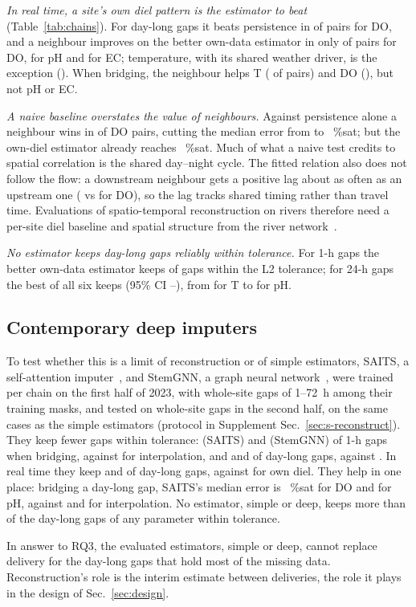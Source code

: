 \emph{In real time, a site's own diel pattern is the estimator to beat} (Table~\ref{tab:chains}). For day-long gaps it beats persistence in \chainDielBeatsPersistDo{} of pairs for DO, and a neighbour improves on the better own-data estimator in only \chainRtWinDo{} of pairs for DO, \chainRtWinPh{} for pH and \chainRtWinEc{} for EC; temperature, with its shared weather driver, is the exception (\chainRtWinT). When bridging, the neighbour helps T (\chainBfWinT{} of pairs) and DO (\chainBfWinDo), but not pH or EC.

\emph{A naive baseline overstates the value of neighbours.} Against persistence alone a neighbour wins in \chainNaiveWinDo{} of DO pairs, cutting the median error from \chainPersistDo{} to \chainBestNbDo~\%sat; but the own-diel estimator already reaches \chainDielDo~\%sat. Much of what a naive test credits to spatial correlation is the shared day--night cycle. The fitted relation also does not follow the flow: a downstream neighbour gets a positive lag about as often as an upstream one (\lagPosDown{} vs \lagPosUp{} for DO), so the lag tracks shared timing rather than travel time. Evaluations of spatio-temporal reconstruction on rivers therefore need a per-site diel baseline and spatial structure from the river network~\cite{peterson2010mixed,jing2024casper}.

\emph{No estimator keeps day-long gaps reliably within tolerance.} For 1-h gaps the better own-data estimator keeps \chainTolOneH{} of gaps within the L2 tolerance; for 24-h gaps the best of all six keeps \recDayAll{} (95\% CI \recDayAllLo--\recDayAllHi), from \recDayT{} for T to \recDayPh{} for pH.

\subsection{Contemporary deep imputers}
\label{sec:rec-deep}
To test whether this is a limit of reconstruction or of simple estimators, SAITS, a self-attention imputer~\cite{du2023saits}, and StemGNN, a graph neural network~\cite{cao2020stemgnn}, were trained per chain on the first half of 2023, with whole-site gaps of 1--72~h among their training masks, and tested on whole-site gaps in the second half, on the same \deepGaps{} cases as the simple estimators (protocol in Supplement Sec.~\ref{sec:s-reconstruct}). They keep fewer gaps within tolerance: \deepBridgeOneSaits{} (SAITS) and \deepBridgeOneStem{} (StemGNN) of 1-h gaps when bridging, against \deepBridgeOneInterp{} for interpolation, and \deepBridgeDaySaits{} and \deepBridgeDayStem{} of day-long gaps, against \deepBridgeDayInterp. In real time they keep \deepRtDaySaits{} and \deepRtDayStem{} of day-long gaps, against \deepRtDayDiel{} for own diel. They help in one place: bridging a day-long gap, SAITS's median error is \deepDayDoSaits~\%sat for DO and \deepDayPhSaits{} for pH, against \deepDayDoInterp{} and \deepDayPhInterp{} for interpolation. No estimator, simple or deep, keeps more than \deepDayBestAny{} of the day-long gaps of any parameter within tolerance.

In answer to RQ3, the evaluated estimators, simple or deep, cannot replace delivery for the day-long gaps that hold most of the missing data. Reconstruction's role is the interim estimate between deliveries, the role it plays in the design of Sec.~\ref{sec:design}.
